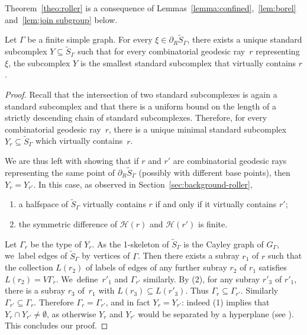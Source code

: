 Theorem~\ref{theo:roller} is a consequence of Lemmas~\ref{lemma:confined},~\ref{lem:borel} and~\ref{lem:join subgroup} below.

\begin{lemma}\label{lemma:confined}
Let $\Gamma$ be a finite simple graph. For every $\xi\in\partial_R\widetilde{S}_\Gamma$, there exists a unique standard subcomplex $Y\subseteq \widetilde{S}_\Gamma$ such that for every combinatorial geodesic ray~$r$ representing $\xi$, the subcomplex $Y$ is the smallest standard subcomplex that virtually contains $r$.
\end{lemma}

\begin{proof}
Recall that the intersection of two standard subcomplexes is again a standard subcomplex and that there is a uniform bound on the length of a strictly descending chain of standard subcomplexes. Therefore, for every combinatorial geodesic ray~$r$, there is a unique minimal standard subcomplex $Y_r\subseteq\widetilde{S}_\Gamma$ which virtually contains~$r$.

We are thus left with showing that if $r$ and $r'$ are combinatorial geodesic rays representing the same point of $\partial_R \widetilde{S}_\Gamma$ (possibly with different base points), then \hbox{$Y_r=Y_{r'}$}. In this case, as observed in Section~\ref{sec:background-roller},
\begin{enumerate}
\item[(1)] a halfspace of $\widetilde{S}_\Gamma$ virtually contains $r$ if and only if it virtually contains $r'$;
\item[(2)] the symmetric difference of $\mathcal{H}(r)$ and $\mathcal{H}(r')$ is finite.
\end{enumerate}
Let $\Gamma_r$ be the type of $Y_r$. As the 1-skeleton of $\widetilde{S}_\Gamma$ is the Cayley graph of $G_\Gamma$, we~label edges of $\widetilde{S}_\Gamma$ by vertices of $\Gamma$. Then there exists a subray $r_1$ of $r$ such that the collection $L(r_2)$ of labels of edges of any further subray $r_2$ of $r_1$ satisfies $L(r_2)=V\Gamma_r$. We~define~$r'_1$ and $\Gamma_{r'}$ similarly. By (2), for any subray $r'_3$ of $r'_1$, there is a subray $r_3$ of~$r_1$ with $L(r_3)\subseteq L(r'_3)$. Thus $\Gamma_r\subseteq \Gamma_{r'}$. Similarly $\Gamma_{r'}\subseteq \Gamma_r$. Therefore $\Gamma_r=\Gamma_{r'}$, and in fact $Y_r=Y_{r'}$: indeed (1) implies that $Y_r\cap Y_{r'}\neq\emptyset$, as otherwise $Y_r$ and $Y_{r'}$ would be separated by a hyperplane (see \cite[Cor.\,13.10]{haglund2008special}). This concludes our proof.
\end{proof}

